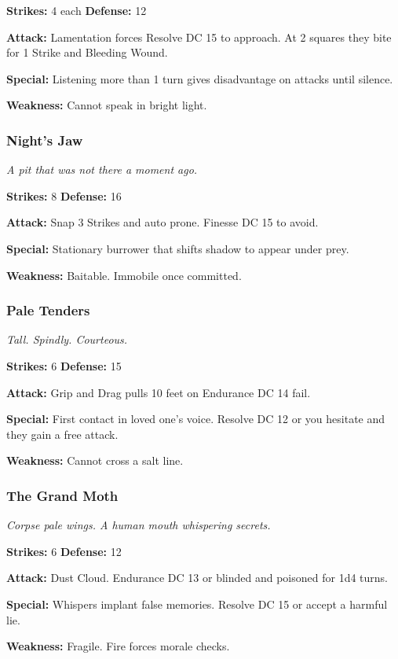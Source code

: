 \documentclass[10pt,twoside]{article}
\begin{document}
\textbf{Strikes:} 4 each \quad \textbf{Defense:} 12

\textbf{Attack:} Lamentation forces Resolve DC 15 to approach. At 2 squares they bite for 1 Strike and Bleeding Wound.

\textbf{Special:} Listening more than 1 turn gives disadvantage on attacks until silence.

\textbf{Weakness:} Cannot speak in bright light.

\subsubsection{Night's Jaw}
\textit{A pit that was not there a moment ago.}

\textbf{Strikes:} 8 \quad \textbf{Defense:} 16

\textbf{Attack:} Snap 3 Strikes and auto prone. Finesse DC 15 to avoid.

\textbf{Special:} Stationary burrower that shifts shadow to appear under prey.

\textbf{Weakness:} Baitable. Immobile once committed.

\subsubsection{Pale Tenders}
\textit{Tall. Spindly. Courteous.}

\textbf{Strikes:} 6 \quad \textbf{Defense:} 15

\textbf{Attack:} Grip and Drag pulls 10 feet on Endurance DC 14 fail.

\textbf{Special:} First contact in loved one's voice. Resolve DC 12 or you hesitate and they gain a free attack.

\textbf{Weakness:} Cannot cross a salt line.

\subsubsection{The Grand Moth}
\textit{Corpse pale wings. A human mouth whispering secrets.}

\textbf{Strikes:} 6 \quad \textbf{Defense:} 12

\textbf{Attack:} Dust Cloud. Endurance DC 13 or blinded and poisoned for 1d4 turns.

\textbf{Special:} Whispers implant false memories. Resolve DC 15 or accept a harmful lie.

\textbf{Weakness:} Fragile. Fire forces morale checks.
\end{document}
